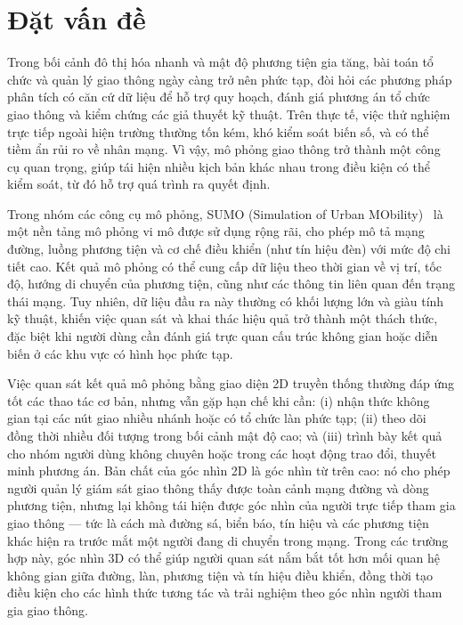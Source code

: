 \documentclass[../DoAn.tex]{subfiles}
\begin{document}
\section{Đặt vấn đề}
\label{section:1.1}

Trong bối cảnh đô thị hóa nhanh và mật độ phương tiện gia tăng, bài toán tổ
chức và quản lý giao thông ngày càng trở nên phức tạp, đòi hỏi các phương pháp
phân tích có căn cứ dữ liệu để hỗ trợ quy hoạch, đánh giá phương án tổ chức
giao thông và kiểm chứng các giả thuyết kỹ thuật. Trên thực tế, việc thử nghiệm
trực tiếp ngoài hiện trường thường tốn kém, khó kiểm soát biến số, và có thể
tiềm ẩn rủi ro về nhân mạng. Vì vậy, mô phỏng giao thông trở thành một công cụ
quan trọng, giúp tái hiện nhiều kịch bản khác nhau trong điều kiện có thể kiểm
soát, từ đó hỗ trợ quá trình ra quyết định.

Trong nhóm các công cụ mô phỏng, \gls{SUMO} (Simulation of Urban MObility)~\cite{sumo2012,sumo_web} là
một nền tảng mô phỏng vi mô được sử dụng rộng rãi, cho phép mô tả mạng đường,
luồng phương tiện và cơ chế điều khiển (như tín hiệu đèn) với mức độ chi tiết
cao. Kết quả mô phỏng có thể cung cấp dữ liệu theo thời gian về vị trí, tốc độ,
hướng di chuyển của phương tiện, cũng như các thông tin liên quan đến trạng thái
mạng. Tuy nhiên, dữ liệu đầu ra này thường có khối lượng lớn và giàu tính kỹ
thuật, khiến việc quan sát và khai thác hiệu quả trở thành một thách thức, đặc
biệt khi người dùng cần đánh giá trực quan cấu trúc không gian hoặc diễn biến ở
các khu vực có hình học phức tạp.

Việc quan sát kết quả mô phỏng bằng giao diện 2D truyền thống thường đáp ứng tốt
các thao tác cơ bản, nhưng vẫn gặp hạn chế khi cần: (i) nhận thức không gian tại
các nút giao nhiều nhánh hoặc có tổ chức làn phức tạp; (ii) theo dõi đồng thời
nhiều đối tượng trong bối cảnh mật độ cao; và (iii) trình bày kết quả cho nhóm
người dùng không chuyên hoặc trong các hoạt động trao đổi, thuyết minh phương
án. Bản chất của góc nhìn 2D là góc nhìn từ trên cao: nó cho phép người quản lý
giám sát giao thông thấy được toàn cảnh mạng đường và dòng phương tiện, nhưng
lại không tái hiện được góc nhìn của người trực tiếp tham gia giao thông --- tức
là cách mà đường sá, biển báo, tín hiệu và các phương tiện khác hiện ra trước
mắt một người đang di chuyển trong mạng. Trong các trường hợp này, góc nhìn 3D
có thể giúp người quan sát nắm bắt tốt hơn mối quan hệ không gian giữa đường,
làn, phương tiện và tín hiệu điều khiển, đồng thời tạo điều kiện cho các hình
thức tương tác và trải nghiệm theo góc nhìn người tham gia giao thông.
\end{document}
